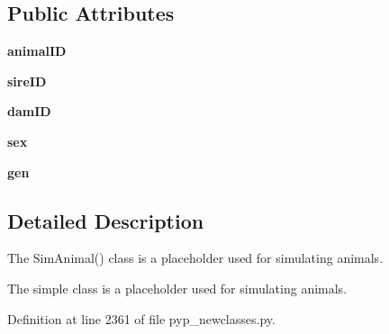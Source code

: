 \subsection*{Public Attributes}
\begin{DoxyCompactItemize}
\item 
\hypertarget{classPyPedal_1_1pyp__newclasses_1_1SimAnimal_a1ea4b52632b8f7196959a33050b70f91}{
{\bfseries animalID}}
\label{classPyPedal_1_1pyp__newclasses_1_1SimAnimal_a1ea4b52632b8f7196959a33050b70f91}

\item 
\hypertarget{classPyPedal_1_1pyp__newclasses_1_1SimAnimal_a14098db938e4814fe6b8cba3d145eb89}{
{\bfseries sireID}}
\label{classPyPedal_1_1pyp__newclasses_1_1SimAnimal_a14098db938e4814fe6b8cba3d145eb89}

\item 
\hypertarget{classPyPedal_1_1pyp__newclasses_1_1SimAnimal_a1d58d1a93972aafa0755f746343e68b6}{
{\bfseries damID}}
\label{classPyPedal_1_1pyp__newclasses_1_1SimAnimal_a1d58d1a93972aafa0755f746343e68b6}

\item 
\hypertarget{classPyPedal_1_1pyp__newclasses_1_1SimAnimal_ab8da5a60230b354cf39f3d543355582c}{
{\bfseries sex}}
\label{classPyPedal_1_1pyp__newclasses_1_1SimAnimal_ab8da5a60230b354cf39f3d543355582c}

\item 
\hypertarget{classPyPedal_1_1pyp__newclasses_1_1SimAnimal_aa5c6d5d0976acd1cf7dbd50663d9ca00}{
{\bfseries gen}}
\label{classPyPedal_1_1pyp__newclasses_1_1SimAnimal_aa5c6d5d0976acd1cf7dbd50663d9ca00}

\end{DoxyCompactItemize}


\subsection{Detailed Description}
The SimAnimal() class is a placeholder used for simulating animals. 

\begin{DoxyVerb}The simple class is a placeholder used for simulating animals.\end{DoxyVerb}
 

Definition at line 2361 of file pyp\_\-newclasses.py.




